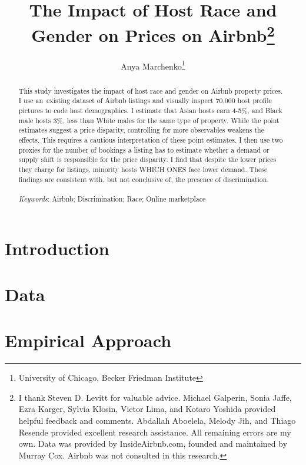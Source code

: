\documentclass[11pt, oneside]{article}
\begin{document}
		
	\title{The Impact of Host Race and Gender on Prices on Airbnb\footnote
		{I thank Steven D. Levitt for valuable advice. Michael Galperin, Sonia Jaffe, Ezra Karger, Sylvia Klosin, Victor Lima, and Kotaro Yoshida provided helpful feedback and comments. Abdallah Aboelela, Melody Jih, and Thiago Resende provided excellent research assistance. All remaining errors are my own. Data was provided by InsideAirbnb.com, founded and maintained by Murray Cox. Airbnb was not consulted in this research.}}
	\author{Anya Marchenko\footnote{University of Chicago, Becker Friedman Institute}}
	\maketitle
	
	\begin{abstract}
		This study investigates the impact of host race and gender on Airbnb property prices. I use an existing dataset of Airbnb listings and visually inspect 70,000 host profile pictures to code host demographics. I estimate that Asian hosts earn 4-5\%, and Black male hosts 3\%, less than White males for the same type of property. While the point estimates suggest a price disparity, controlling for more observables weakens the effects. This requires a cautious interpretation of these point estimates. I then use two proxies for the number of bookings a listing has to estimate whether a demand or supply shift is responsible for the price disparity. I find that despite the lower prices they charge for listings, minority hosts WHICH ONES face lower demand. These findings are consistent with, but not conclusive of, the presence of discrimination. 
		\\\\
		\textit{Keywords}: Airbnb; Discrimination; Race; Online marketplace
		
	\end{abstract}
	
	\newpage
	
	\singlespacing
	\section{Introduction}
	
	\label{intro}

	\section{Data}
	
	\label{data}
	
	\section{Empirical Approach}
	
	\label{empirical}
	
\end{document}
